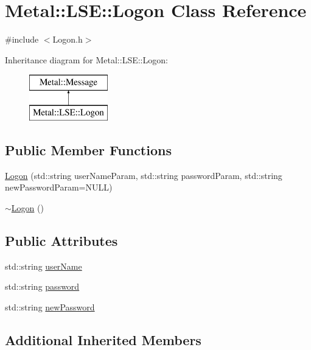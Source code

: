 \hypertarget{classMetal_1_1LSE_1_1Logon}{}\section{Metal\+:\+:L\+S\+E\+:\+:Logon Class Reference}
\label{classMetal_1_1LSE_1_1Logon}


{\ttfamily \#include $<$Logon.\+h$>$}

Inheritance diagram for Metal\+:\+:L\+S\+E\+:\+:Logon\+:\begin{figure}[H]
\begin{center}
\leavevmode
\includegraphics[height=2.000000cm]{classMetal_1_1LSE_1_1Logon}
\end{center}
\end{figure}
\subsection*{Public Member Functions}
\begin{DoxyCompactItemize}
\item 
\hyperlink{classMetal_1_1LSE_1_1Logon_a75776118c55da42fc39a07d929b922b9}{Logon} (std\+::string user\+Name\+Param, std\+::string password\+Param, std\+::string new\+Password\+Param=N\+U\+L\+L)
\item 
\hyperlink{classMetal_1_1LSE_1_1Logon_a2e00af90de09f6977e50ca9ddebafec7}{$\sim$\+Logon} ()
\end{DoxyCompactItemize}
\subsection*{Public Attributes}
\begin{DoxyCompactItemize}
\item 
std\+::string \hyperlink{classMetal_1_1LSE_1_1Logon_a10fa4ed887ed159b7157e5aab908b18f}{user\+Name}
\item 
std\+::string \hyperlink{classMetal_1_1LSE_1_1Logon_ae8181000986aeb93bf3e3b989fc238ae}{password}
\item 
std\+::string \hyperlink{classMetal_1_1LSE_1_1Logon_a53afe9b298d908d8580462e9af4cdd5a}{new\+Password}
\end{DoxyCompactItemize}
\subsection*{Additional Inherited Members}


